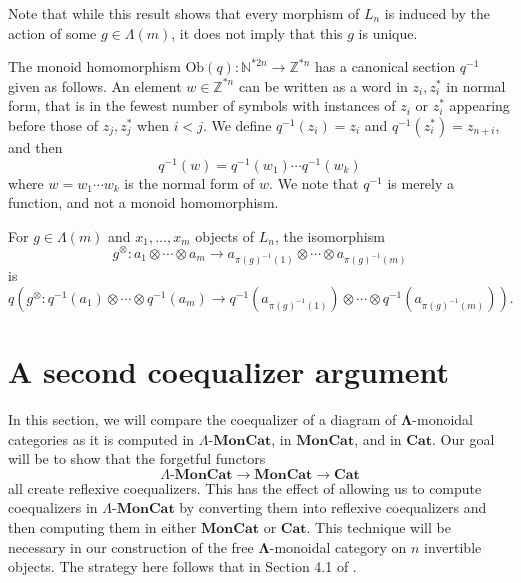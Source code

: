 \documentclass{amsbook} %
\newcommand{\mb}{\mathbf}
\newcommand{\ML}{\mathbf{\Lambda}}
\newcommand{\lmc}{\Lambda\mbox{-}\mb{MonCat}}
\newcommand{\moncat}{\ensuremath{\mb{MonCat}}}
\newcommand{\cat}{\ensuremath{\mb{Cat}}}
\numberwithin{section}{chapter}
\begin{document}
Note that while this result shows that every morphism of $L_n$ is induced by the action of some $g \in \Lambda(m)$, it does not imply that this $g$ is unique.

\begin{conv}
The monoid homomorphism $\mathrm{Ob}(q)  \colon  \mathbb{N}^{\ast 2n}  \rightarrow  \mathbb{Z}^{\ast n}$ has a canonical section $q^{-1}$ given as follows. An element $w \in \mathbb{Z}^{* n}$ can be written as a word in $z_i, z_i^*$ in normal form, that is in the fewest number of symbols with instances of $z_i$ or $z_i^*$ appearing before those of $z_j, z_j^*$ when $i < j$. We define $q^{-1}(z_i) = z_i$ and $q^{-1}(z_i^*) = z_{n+i}$, and then 
  \[
    q^{-1}(w) = q^{-1}(w_1) \cdots q^{-1}(w_k)
  \]
where $w = w_1 \cdots w_k$ is the normal form of $w$. We note that $q^{-1}$ is merely a function, and not a monoid homomorphism.
\end{conv}

\begin{cor}\label{action_on_L}
For $g \in \Lambda(m)$ and $x_1, \ldots, x_m$ objects of $L_n$, the isomorphism
  \[
    g^{\otimes} \colon  a_1 \otimes \cdots \otimes a_m \rightarrow a_{\pi(g)^{-1}(1)} \otimes \cdots \otimes a_{\pi(g)^{-1}(m)}
  \]
is
\[
q \left(g^{\otimes} \colon  q^{-1}(a_1) \otimes \cdots \otimes q^{-1}(a_m) \rightarrow   q^{-1}(a_{\pi(g)^{-1}(1)}) \otimes \cdots \otimes q^{-1}(a_{\pi(g)^{-1}(m)})    \right).
\]
\end{cor}

\section{A second coequalizer argument}
In this section, we will compare the coequalizer of a diagram of $\ML$-monoidal categories as it is computed in $\lmc$, in $\moncat$, and in $\cat$. Our goal will be to show that the forgetful functors 
  \[
    \lmc \rightarrow \moncat \rightarrow \cat
  \]
all create reflexive coequalizers. This has the effect of allowing us to compute coequalizers in $\lmc$ by converting them into reflexive coequalizers and then computing them in either $\moncat$ or $\cat$. This technique will be necessary in our construction of the free $\ML$-monoidal category on $n$ invertible objects. The strategy here follows that in Section 4.1 of \cite{lack-cod}.
\end{document}
